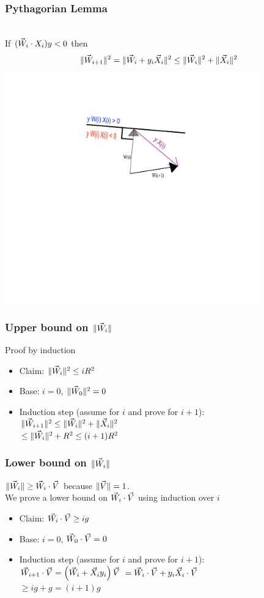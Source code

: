 \documentclass[handout]{beamer}
\begin{document}
\begin{frame}
\frametitle{Pythagorian Lemma}
~\\
If $(\vec{W}_i \cdot X_i) y <0$ then\\
\pause
\[
\| \vec{W}_{i+1} \|^2 = \|\vec{W}_i + y_i \vec{X}_i\|^2 \leq \|\vec{W}_i\|^2 + \|\vec{X}_i\|^2 
\]
\pause
\includegraphics[height=10cm]{PerceptronAnim/PerceptronError.pdf}
\end{frame}

\begin{frame}
\frametitle{Upper bound on $\| \vec{W}_i \|$}
\pause
Proof by induction
\begin{itemize}
\item Claim: $ \| \vec{W}_{i} \|^2 \leq i R^2 $
\item Base: $i=0$, $\|\vec{W}_0\|^2 = 0$
\item Induction step (assume for $i$ and prove for $i+1$):\\
$ \| \vec{W}_{i+1} \|^2 \leq \|\vec{W}_i\|^2 + \|\vec{X}_i\|^2 $ \\
$\leq \|\vec{W}_i\|^2 + R^2 \leq (i+1) R^2$

\end{itemize}
\end{frame}

\begin{frame}
\frametitle{Lower bound on $\| \vec{W}_i \|$}
\pause
$\|\vec{W}_i\| \geq \vec{W}_{i} \cdot \vec{V}$ because $\| \vec{V} \|=1$.\\
\pause
We prove a lower bound on $\vec{W}_{i} \cdot \vec{V}$ using induction over $i$
\begin{itemize}
\item Claim: $ \vec{W}_{i} \cdot \vec{V} \geq i g $
\item Base: $i=0$, $\vec{W}_0 \cdot \vec{V} = 0$
\item Induction step (assume for $i$ and prove for $i+1$):\\
$ \vec{W}_{i+1} \cdot \vec{V}  = \left( \vec{W}_i + \vec{X}_i y_i \right) \vec{V}$
\pause
$= \vec{W}_i \cdot \vec{V} + y_i \vec{X}_i \cdot \vec{V}$ \\
$\geq i g + g = (i+1) g$
\end{itemize}
\end{frame}
\end{document}
